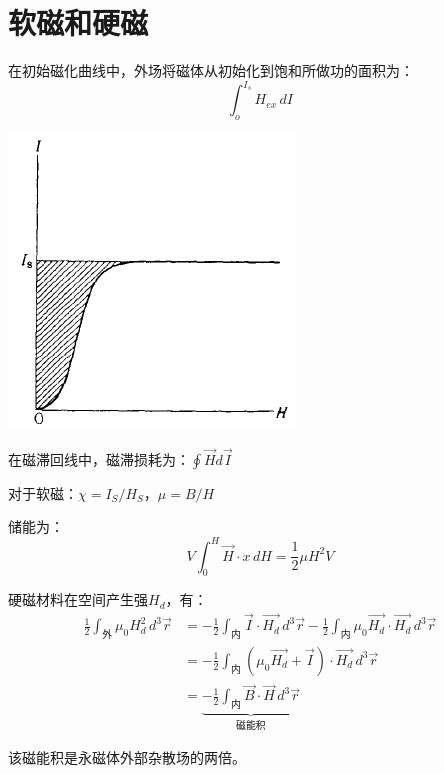 \section{软磁和硬磁}
在初始磁化曲线中，外场将磁体从初始化到饱和所做功的面积为：
\[ \int_o^{I_s} H_{ex}\,dI \]
\begin{center}
    \includegraphics[scale=0.7]{images/1_6.png}
\end{center}

在磁滞回线中，磁滞损耗为：$\oint \vec{H}d\vec{I}$

对于软磁：$\chi=I_S/H_S$，$\mu=B/H$

储能为：
\[ V\int_0^H \vec{H} \cdot x \,dH = \frac{1}{2} \mu H^2 V \]

硬磁材料在空间产生强$H_d$，有：
\begin{align*}
    \frac{1}{2} \int_\text{外} \mu_0 H_d^2 \,d^3\vec{r}
    &= -\frac{1}{2} \int_\text{内} \vec{I} \cdot \vec{H_d} \,d^3\vec{r}
        -\frac{1}{2} \int_\text{内} \mu_0\vec{H_d} \cdot \vec{H_d} \,d^3\vec{r} \\
    &= -\frac{1}{2} \int_\text{内}(\mu_0 \vec{H_d} + \vec{I})\cdot \vec{H_d} \,d^3\vec{r}\\
    &= \underbrace{-\frac{1}{2} \int_\text{内}\vec{B} \cdot \vec{H} \,d^3\vec{r}}_\text{磁能积}
\end{align*}

该磁能积是永磁体外部杂散场的两倍。

